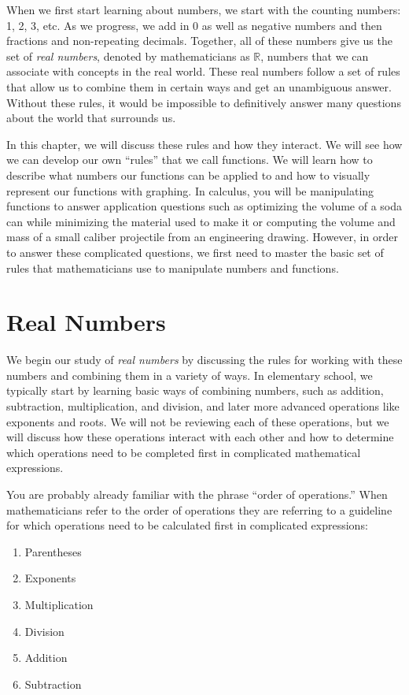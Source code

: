 When we first start learning about numbers, we start with the counting numbers: 1, 2, 3, etc. As we progress, we add in 0 as well as negative numbers and then fractions and non-repeating decimals. Together, all of these numbers give us the set of \textit{real numbers}, denoted by mathematicians as $\mathbb R$, numbers that we can associate with concepts in the real world. These real numbers follow a set of rules that allow us to combine them in certain ways and get an unambiguous answer. Without these rules, it would be impossible to definitively answer many questions about the world that surrounds us.

In this chapter, we will discuss these rules and how they interact. We will see how we can develop our own ``rules'' that we call functions. We will learn how to describe what numbers our functions can be applied to and how to visually represent our functions with graphing. In calculus, you will be manipulating functions to answer application questions such as optimizing the volume of a soda can while minimizing the material used to make it or computing the volume and mass of a small caliber projectile from an engineering drawing. However, in order to answer these complicated questions, we first need to master the basic set of rules that mathematicians use to manipulate numbers and functions.


\section{Real Numbers}\label{sec:real_numbers}

We begin our study of \textit{real numbers} by discussing the rules for working with these numbers and combining them in a variety of ways. In elementary school, we typically start by learning basic ways of combining numbers, such as addition, subtraction, multiplication, and division, and later more advanced operations like exponents and roots. We will not be reviewing each of these operations, but we will discuss how these operations interact with each other and how to determine which operations need to be completed first in complicated mathematical expressions.

You are probably already familiar with the phrase ``order of operations.'' When mathematicians refer to the order of operations they are referring to a guideline for which operations need to be calculated first in complicated expressions:

\begin{multicols}{2}
\begin{enumerate}
	\item Parentheses
	\item Exponents
	\item Multiplication
	\item Division
	\item Addition
	\item Subtraction
\end{enumerate}
\end{multicols}

